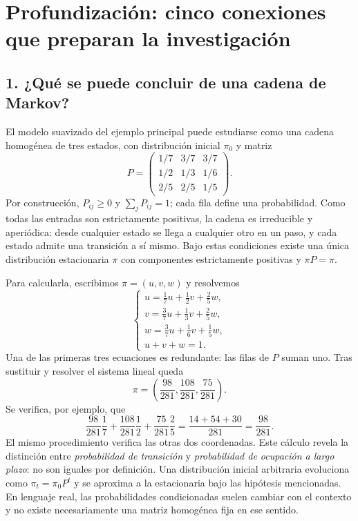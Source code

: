 \chapter*{Profundización: cinco conexiones que preparan la investigación}

\section*{1. ¿Qué se puede concluir de una cadena de Markov?}
El modelo suavizado del ejemplo principal puede estudiarse como una cadena
homogénea de tres estados, con distribución inicial $\pi_0$ y matriz
\[
P=\begin{pmatrix}1/7&3/7&3/7\\1/2&1/3&1/6\\2/5&2/5&1/5\end{pmatrix}.
\]
Por construcción, $P_{ij}\ge0$ y $\sum_jP_{ij}=1$; cada fila define
una probabilidad. Como todas las entradas son estrictamente positivas,
la cadena es irreducible y aperiódica: desde cualquier estado se llega
a cualquier otro en un paso, y cada estado admite una transición a sí mismo.
Bajo estas condiciones existe una única distribución estacionaria $\pi$
con componentes estrictamente positivas y $\pi P=\pi$.

Para calcularla, escribimos $\pi=(u,v,w)$ y resolvemos
\[
\begin{cases}
 u=\tfrac17u+\tfrac12v+\tfrac25w,\\
 v=\tfrac37u+\tfrac13v+\tfrac25w,\\
 w=\tfrac37u+\tfrac16v+\tfrac15w,\\
 u+v+w=1.
\end{cases}
\]
Una de las primeras tres ecuaciones es redundante: las filas de $P$
suman uno. Tras sustituir y resolver el sistema lineal queda
\[
\boxed{\pi=\left(\frac{98}{281},\frac{108}{281},\frac{75}{281}\right).}
\]
Se verifica, por ejemplo, que
\[
\frac{98}{281}\frac17+\frac{108}{281}\frac12
+\frac{75}{281}\frac25
=\frac{14+54+30}{281}=\frac{98}{281}.
\]
El mismo procedimiento verifica las otras dos coordenadas.
Este cálculo revela la distinción entre \emph{probabilidad de transición}
y \emph{probabilidad de ocupación a largo plazo}: no son iguales por
definición. Una distribución inicial arbitraria evoluciona como
$\pi_t=\pi_0P^t$ y se aproxima a la estacionaria bajo las hipótesis
mencionadas. En lenguaje real, las probabilidades condicionadas suelen
cambiar con el contexto y no existe necesariamente una matriz homogénea
fija en ese sentido.

